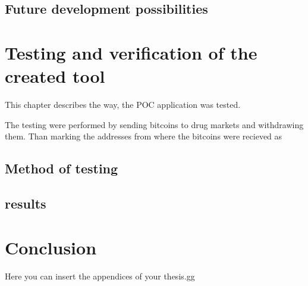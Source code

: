 \documentclass[
  digital, %
  table,   %
  lof,     %
  lot,     %
  oneside
]{fithesis3}
\begin{document}
\section{Future development possibilities}


\chapter{Testing and verification of the created tool}
This chapter describes the way, the POC application was tested.

The testing were performed by sending bitcoins to drug markets and withdrawing them.
Than marking the addresses from where the bitcoins were recieved as 

\section{Method of testing}
\section{results}



\chapter{Conclusion}

Here you can insert the appendices of your thesis.gg

\printbibliography
\end{document}
